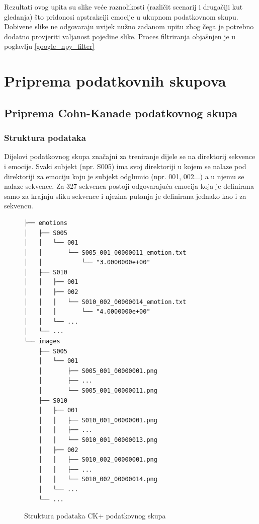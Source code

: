 \documentclass[times, utf8, zavrsni,numeric]{fer}
\begin{document}
Rezultati ovog upita su slike veće raznolikosti (različit scenarij i drugačiji kut gledanja) što pridonosi apstrakciji emocije u ukupnom podatkovnom skupu. Dobivene slike ne odgovaraju uvijek nužno zadanom upitu zbog čega je potrebno dodatno provjeriti valjanost pojedine slike. Proces filtriranja objašnjen je u poglavlju \ref{google_npy_filter}


\section{Priprema podatkovnih skupova}
\subsection{Priprema Cohn-Kanade podatkovnog skupa}
\subsubsection{Struktura podataka}

Dijelovi podatkovnog skupa značajni za treniranje dijele se na direktorij sekvence i emocije. Svaki subjekt (npr. S005) ima svoj direktoriji u kojem se nalaze pod direktoriji za emociju koju je subjekt odglumio (npr. 001, 002...) a u njemu se nalaze sekvence. Za 327 sekvenca postoji odgovarajuća emocija koja je definirana samo za krajnju sliku sekvence i njezina putanja je definirana jednako kao i za sekvencu.

\pagebreak

\begin{figure}[H]
\centering
\begin{Verbatim}[fontsize=\small]
├── emotions
│   ├── S005
│   │   └── 001
│   │       └── S005_001_00000011_emotion.txt
│   │       	└── "3.0000000e+00"
│   ├── S010
│   │   ├── 001
│   │   ├── 002
│   │   │   └── S010_002_00000014_emotion.txt
│   │   │   	└── "4.0000000e+00"
│   │   └── ...
│   └── ...
└── images
    ├── S005
    │   └── 001
    │       ├── S005_001_00000001.png
    │       ├── ...
    │       └── S005_001_00000011.png
    ├── S010
    │   ├── 001
    │   │   ├── S010_001_00000001.png
    │   │   ├── ...
    │   │   └── S010_001_00000013.png
    │   ├── 002
    │   │   ├── S010_002_00000001.png
    │   │   ├── ...
    │   │   └── S010_002_00000014.png
    │   └── ...
    └── ...

\end{Verbatim}
\caption{Struktura podataka CK+ podatkovnog skupa}
\label{cb:npy_tree}
\end{figure}
\end{document}
